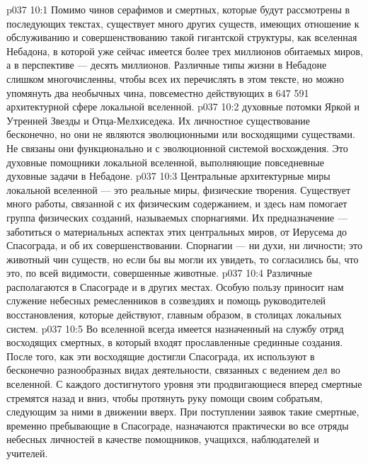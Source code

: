 \vs p037 10:1 Помимо чинов серафимов и смертных, которые будут рассмотрены в последующих текстах, существует много других существ, имеющих отношение к обслуживанию и совершенствованию такой гигантской структуры, как вселенная Небадона, в которой уже сейчас имеется более трех миллионов обитаемых миров, а в перспективе --- десять миллионов. Различные типы жизни в Небадоне слишком многочисленны, чтобы всех их перечислять в этом тексте, но можно упомянуть два необычных чина, повсеместно действующих в 647 591 архитектурной сфере локальной вселенной.
\vs p037 10:2 \pc {} духовные потомки Яркой и Утренней Звезды и Отца\hyp{}Мелхиседека. Их личностное существование бесконечно, но они не являются эволюционными или восходящими существами. Не связаны они функционально и с эволюционной системой восхождения. Это духовные помощники локальной вселенной, выполняющие повседневные духовные задачи в Небадоне.
\vs p037 10:3 \pc {} Центральные архитектурные миры локальной вселенной --- это реальные миры, физические творения. Существует много работы, связанной с их физическим содержанием, и здесь нам помогает группа физических созданий, называемых спорнагиями. Их предназначение --- заботиться о материальных аспектах этих центральных миров, от Иерусема до Спасограда, и об их совершенствовании. Спорнагии --- ни духи, ни личности; это животный чин существ, но если бы вы могли их увидеть, то согласились бы, что это, по всей видимости, совершенные животные.
\vs p037 10:4 \pc Различные  располагаются в Спасограде и в других местах. Особую пользу приносит нам служение небесных ремесленников в созвездиях и помощь руководителей восстановления, которые действуют, главным образом, в столицах локальных систем.
\vs p037 10:5 Во вселенной всегда имеется назначенный на службу отряд восходящих смертных, в который входят прославленные срединные создания. После того, как эти восходящие достигли Спасограда, их используют в бесконечно разнообразных видах деятельности, связанных с ведением дел во вселенной. С каждого достигнутого уровня эти продвигающиеся вперед смертные стремятся назад и вниз, чтобы протянуть руку помощи своим собратьям, следующим за ними в движении вверх. При поступлении заявок такие смертные, временно пребывающие в Спасограде, назначаются практически во все отряды небесных личностей в качестве помощников, учащихся, наблюдателей и учителей.
